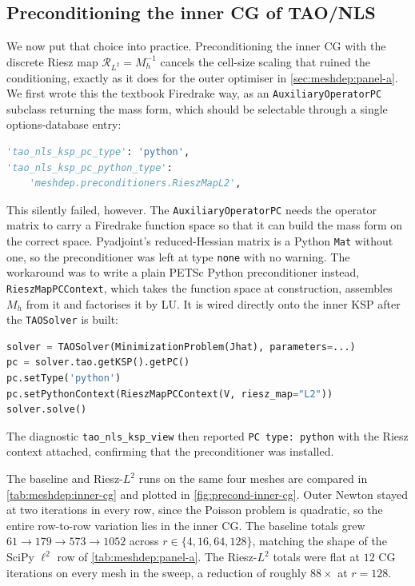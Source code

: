 \documentclass[a4paper,11pt]{article}
\newcommand{\Rmap}{\mathcal{R}}              %
\theoremstyle{spacedplain} \newtheorem{theorem}[counter]{Theorem} \newtheorem{lemma}[counter]{Lemma} \newtheorem{prop}[counter]{Proposition} \newtheorem{cor}[counter]{Corollary}
\theoremstyle{spaceddefinition} \newtheorem{defn}[counter]{Definition} \newtheorem{example}[counter]{Example} \newtheorem{remark}[counter]{Remark}
\begin{document}
\subsection{Preconditioning the inner CG of TAO/NLS}
\label{sec:meshdep:inner-cg}
We now put that choice into practice. Preconditioning the inner CG with the discrete Riesz map $\Rmap_{L^{2}} = M_h^{-1}$ cancels the cell-size scaling that ruined the conditioning, exactly as it does for the outer optimiser in \cref{sec:meshdep:panel-a}. We first wrote this the textbook Firedrake way, as an \texttt{AuxiliaryOperatorPC} subclass returning the mass form, which should be selectable through a single options-database entry:
\begin{lstlisting}[language=Python]
'tao_nls_ksp_pc_type': 'python',
'tao_nls_ksp_pc_python_type':
    'meshdep.preconditioners.RieszMapL2',
\end{lstlisting}
This silently failed, however. The \texttt{AuxiliaryOperatorPC} needs the operator matrix to carry a Firedrake function space so that it can build the mass form on the correct space. Pyadjoint's reduced-Hessian matrix is a Python \texttt{Mat} without one, so the preconditioner was left at type \texttt{none} with no warning. The workaround was to write a plain PETSc Python preconditioner instead, \texttt{RieszMapPCContext}, which takes the function space at construction, assembles $M_h$ from it and factorises it by LU. It is wired directly onto the inner KSP after the \texttt{TAOSolver} is built:
\begin{lstlisting}[language=Python]
solver = TAOSolver(MinimizationProblem(Jhat), parameters=...)
pc = solver.tao.getKSP().getPC()
pc.setType('python')
pc.setPythonContext(RieszMapPCContext(V, riesz_map="L2"))
solver.solve()
\end{lstlisting}
The diagnostic \texttt{tao\_nls\_ksp\_view} then reported \texttt{PC type: python} with the Riesz context attached, confirming that the preconditioner was installed.

The baseline and Riesz-$L^{2}$ runs on the same four meshes are compared in \cref{tab:meshdep:inner-cg} and plotted in \cref{fig:precond-inner-cg}. Outer Newton stayed at two iterations in every row, since the Poisson problem is quadratic, so the entire row-to-row variation lies in the inner CG. The baseline totals grew $61 \to 179 \to 573 \to 1052$ across $r \in \{4, 16, 64, 128\}$, matching the shape of the SciPy $\ell^{2}$ row of \cref{tab:meshdep:panel-a}. The Riesz-$L^{2}$ totals were flat at $12$ CG iterations on every mesh in the sweep, a reduction of roughly $88\times$ at $r = 128$.
\end{document}
